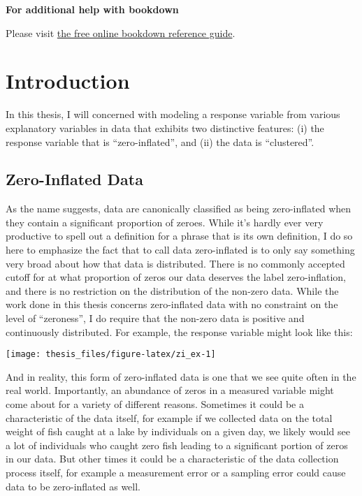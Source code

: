 \documentclass[12pt,twoside]{reedthesis}
\begin{document}
\textbf{For additional help with bookdown}

Please visit \href{https://bookdown.org/yihui/bookdown/}{the free online bookdown reference guide}.

\hypertarget{intro-section}{%
\chapter{Introduction}\label{intro-section}}

In this thesis, I will concerned with modeling a response variable from various explanatory variables in data that exhibits two distinctive features: (i) the response variable that is ``zero-inflated'', and (ii) the data is ``clustered''.

\hypertarget{zero-inflated-data}{%
\section{Zero-Inflated Data}\label{zero-inflated-data}}

As the name suggests, data are canonically classified as being zero-inflated when they contain a significant proportion of zeroes. While it's hardly ever very productive to spell out a definition for a phrase that is its own definition, I do so here to emphasize the fact that to call data zero-inflated is to only say something very broad about how that data is distributed. There is no commonly accepted cutoff for at what proportion of zeros our data deserves the label zero-inflation, and there is no restriction on the distribution of the non-zero data. While the work done in this thesis concerns zero-inflated data with no constraint on the level of ``zeroness'', I do require that the non-zero data is positive and continuously distributed. For example, the response variable might look like this:
\begin{center}\texttt{[image: thesis\_files/figure-latex/zi\_ex-1]} \end{center}

And in reality, this form of zero-inflated data is one that we see quite often in the real world. Importantly, an abundance of zeros in a measured variable might come about for a variety of different reasons. Sometimes it could be a characteristic of the data itself, for example if we collected data on the total weight of fish caught at a lake by individuals on a given day, we likely would see a lot of individuals who caught zero fish leading to a significant portion of zeros in our data. But other times it could be a characteristic of the data collection process itself, for example a measurement error or a sampling error could cause data to be zero-inflated as well.
\newline
\end{document}
